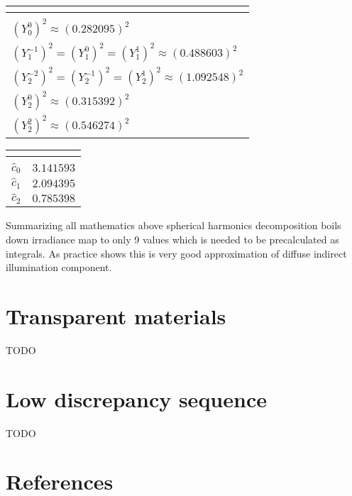 \tabulinesep=1mm
\begin{longtabu} spread 0pt [c]{*{1}{|X[-1]}|}
\hline
\rowcolor{\tableheadbgcolor}\textbf{ }\\
\endfirsthead
\hline
\endfoot
\hline
\rowcolor{\tableheadbgcolor}\textbf{ }\\
\endhead
$(Y_0^0)^2 \approx (0.282095)^2$ \\
$(Y_1^{-1})^2 = (Y_1^0)^2 = (Y_1^1)^2 \approx (0.488603)^2$ \\
$(Y_2^{-2})^2 = (Y_2^{-1})^2 = (Y_2^1)^2 \approx (1.092548)^2$ \\
$(Y_2^0)^2 \approx (0.315392)^2$ \\
$(Y_2^2)^2 \approx (0.546274)^2$ \\
\end{longtabu}
\tabulinesep=1mm
\begin{longtabu} spread 0pt [c]{*{2}{|X[-1]}|}
\hline
\rowcolor{\tableheadbgcolor}\textbf{ }&\textbf{ }\\
\endfirsthead
\hline
\endfoot
\hline
\rowcolor{\tableheadbgcolor}\textbf{ }&\textbf{ }\\
\endhead
$\hat{c}_0$ &$3.141593$ \\
$\hat{c}_1$ &$2.094395$ \\
$\hat{c}_2$ &$0.785398$ \\
\end{longtabu}
Summarizing all mathematics above spherical harmonics decomposition boils down irradiance map to only 9 values which is needed to be precalculated as integrals. As practice shows this is very good approximation of diffuse indirect illumination component.\hypertarget{specification__pbr_math_pbr_transparency}{}\section{Transparent materials}\label{specification__pbr_math_pbr_transparency}
T\+O\+DO\hypertarget{specification__pbr_math_pbr_low_discrepancy}{}\section{Low discrepancy sequence}\label{specification__pbr_math_pbr_low_discrepancy}
T\+O\+DO\hypertarget{specification__pbr_math_pbr_references}{}\section{References}\label{specification__pbr_math_pbr_references}
